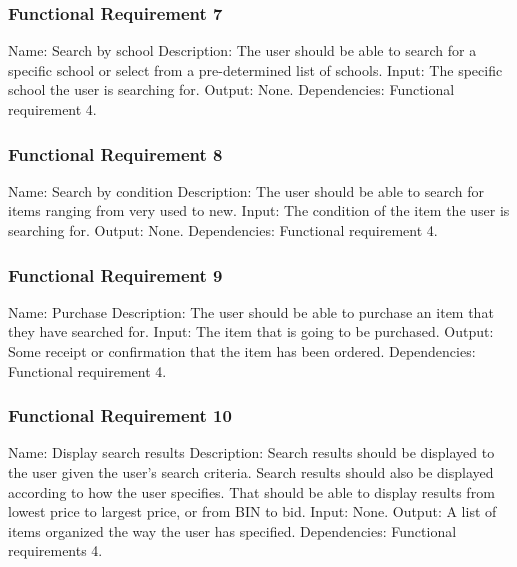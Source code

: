 \documentclass[journal,compsoc, 10pt, draftclsnofoot, onecolumn]{IEEEtran}
\begin{document}
\subsubsection{Functional Requirement 7}
Name: Search by school\newline
Description: The user should be able to search for a specific school or select 
from a pre-determined list of schools.\newline
Input: The specific school the user is searching for.\newline
Output: None.\newline
Dependencies: Functional requirement 4.

\subsubsection{Functional Requirement 8}
Name: Search by condition\newline
Description: The user should be able to search for items ranging from very used 
to new.\newline
Input: The condition of the item the user is searching for.\newline
Output: None.\newline
Dependencies: Functional requirement 4.

\subsubsection{Functional Requirement 9}
Name: Purchase\newline
Description: The user should be able to purchase an item that they have searched
 for.\newline
Input: The item that is going to be purchased.\newline
Output: Some receipt or confirmation that the item has been ordered.\newline
Dependencies: Functional requirement 4.

\subsubsection{Functional Requirement 10}
Name: Display search results\newline
Description: Search results should be displayed to the user given the user's 
search criteria. Search results should also be displayed according to how the 
user specifies. That should be able to display results from lowest price to 
largest price, or from BIN to bid.\newline
Input: None.\newline
Output: A list of items organized the way the user has specified.\newline
Dependencies: Functional requirements 4.
\end{document}
